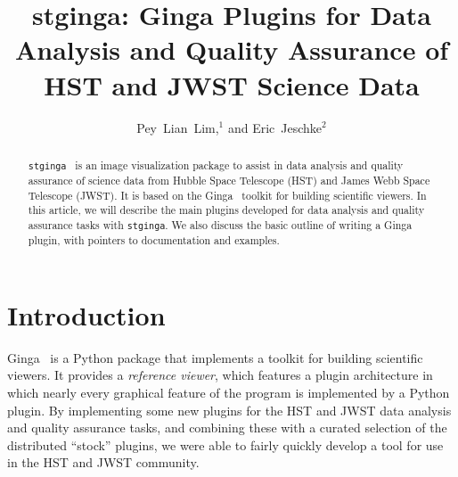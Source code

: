 \documentclass[11pt,twoside]{article}
\begin{document}
\title{stginga: Ginga Plugins for Data Analysis and Quality Assurance of HST and JWST Science Data}

\author{Pey~Lian~Lim,$^1$ and Eric~Jeschke$^2$
  }




\begin{abstract}

{\tt stginga}~\citep{stginga} is an image visualization package to assist
in data analysis and quality assurance of science data from Hubble Space
Telescope (HST) and James Webb Space Telescope (JWST).  It is based on the
Ginga~\citep{ginga} toolkit for building scientific viewers.
In this article, we will describe the main plugins developed for data
analysis and quality assurance tasks with {\tt stginga}.  We also discuss the
basic outline of writing a Ginga plugin, with pointers to documentation
and examples.

\end{abstract}

\section{Introduction}

Ginga~\citep{Jeschke15A} is a Python package that
implements a toolkit for building scientific viewers.  It provides
a \emph{reference viewer}, which features
a plugin architecture in which nearly every graphical feature of the
program is implemented by a Python plugin.
By implementing some new plugins for the HST and JWST data analysis and
quality assurance tasks, and combining these with a curated selection of
the distributed ``stock'' plugins, we were able to fairly quickly
develop a tool for use in the HST and JWST community.
\end{document}
